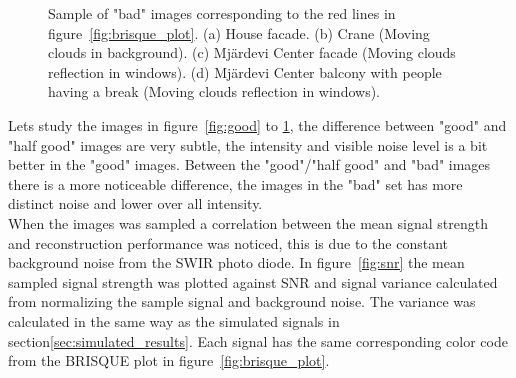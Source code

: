 \begin{figure}[H]
\begin{minipage}[t]{0.245\textwidth}
    \subcaption{}
    \label{fig:bad4}
\end{minipage}
    \caption{Sample of "bad" images corresponding to the red lines in figure~\ref{fig:brisque_plot}.
    (a)  House facade. (b) Crane (Moving clouds in background). (c) Mjärdevi Center facade (Moving clouds reflection in windows). (d) Mjärdevi Center balcony with people having a break (Moving clouds reflection in windows).}
    \label{fig:bad}
\end{figure}

Lets study the images in figure~\ref{fig:good} to \ref{fig:bad}, the difference between "good" and "half good" images are very subtle, the intensity and visible noise level is a bit better in the "good" images. Between the "good"/"half good" and "bad" images there is a more noticeable difference, the images in the "bad" set has more distinct noise and lower over all intensity.\\[0.1in]

When the images was sampled a correlation between the mean signal strength and reconstruction performance was noticed, this is due to the constant background noise from the SWIR photo diode. In figure~\ref{fig:snr} the mean sampled signal strength was plotted against SNR and signal variance calculated from normalizing the sample signal and background noise. The variance was calculated in the same way as the simulated signals in section\ref{sec:simulated_results}.  Each signal has the same corresponding color code from the BRISQUE plot in figure~\ref{fig:brisque_plot}.
 

